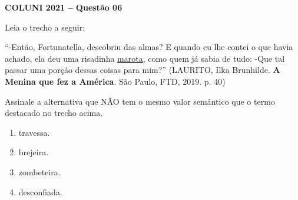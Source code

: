 \textbf{COLUNI 2021 -- Questão 06}\par\medskip Leia o trecho a seguir:

\par

“-Então, Fortunatella, descobriu das almas? E quando eu lhe contei o que havia achado, ela deu uma risadinha \underline{marota}, como quem já sabia de tudo: -Que tal passar uma porção dessas coisas para mim?” (LAURITO, Ilka Brunhilde. \textbf{A Menina que fez a América}. São Paulo, FTD, 2019. p. 40)

\par

Assinale a alternativa que NÃO tem o mesmo valor semântico que o termo destacado no trecho acima.\begin{enumerate}
\item travessa.
\item brejeira.
\item zombeteira.
\item desconfiada.\end{enumerate}
